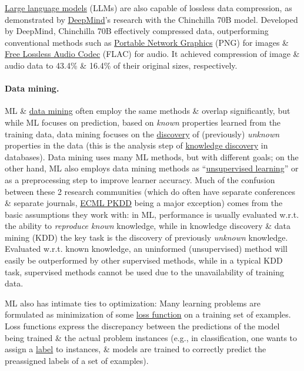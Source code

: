 \documentclass{article}
\begin{document}
\href{https://en.wikipedia.org/wiki/Large_language_model}{Large language models} (LLMs) are also capable of lossless data compression, as demonstrated by \href{https://en.wikipedia.org/wiki/DeepMind}{DeepMind}'s research with the Chinchilla 70B model. Developed by DeepMind, Chinchilla 70B effectively compressed data, outperforming conventional methods such as \href{https://en.wikipedia.org/wiki/Portable_Network_Graphics}{Portable Network Graphics} (PNG) for images \& \href{https://en.wikipedia.org/wiki/Free_Lossless_Audio_Codec}{Free Lossless Audio Codec} (FLAC) for audio. It achieved compression of image \& audio data to 43.4\% \& 16.4\% of their original sizes, respectively.

\paragraph{Data mining.} ML \& \href{https://en.wikipedia.org/wiki/Data_mining}{data mining} often employ the same methods \& overlap significantly, but while ML focuses on prediction, based on {\it known} properties learned from the training data, data mining focuses on the \href{https://en.wikipedia.org/wiki/Discovery_(observation)}{discovery} of (previously) {\it unknown} properties in the data (this is the analysis step of \href{https://en.wikipedia.org/wiki/Knowledge_discovery}{knowledge discovery} in databases). Data mining uses many ML methods, but with different goals; on the other hand, ML also employs data mining methods as ``\href{https://en.wikipedia.org/wiki/Unsupervised_learning}{unsupervised learning}'' or as a preprocessing step to improve learner accuracy. Much of the confusion between these 2 research communities (which do often have separate conferences \& separate journals, \href{https://en.wikipedia.org/wiki/ECML_PKDD}{ECML PKDD} being a major exception) comes from the basic assumptions they work with: in ML, performance is usually evaluated w.r.t. the ability to {\it reproduce known} knowledge, while in knowledge discovery \& data mining (KDD) the key task is the discovery of previously {\it unknown} knowledge. Evaluated w.r.t. known knowledge, an uninformed (unsupervised) method will easily be outperformed by other supervised methods, while in a typical KDD task, supervised methods cannot be used due to the unavailability of training data.

ML also has intimate ties to optimization: Many learning problems are formulated as minimization of some \href{https://en.wikipedia.org/wiki/Loss_function}{loss function} on a training set of examples. Loss functions express the discrepancy between the predictions of the model being trained \& the actual problem instances (e.g., in classification, one wants to assign a \href{https://en.wikipedia.org/wiki/Labeled_data}{label} to instances, \& models are trained to correctly predict the preassigned labels of a set of examples).
\end{document}
